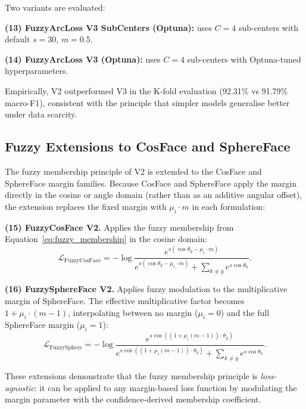 Two variants are evaluated:

\textbf{(13) FuzzyArcLoss V3 SubCenters (Optuna):} uses $C = 4$ sub-centers with default $s = 30$, $m = 0.5$.

\textbf{(14) FuzzyArcLoss V3 (Optuna):} uses $C = 4$ sub-centers with Optuna-tuned hyperparameters.

Empirically, V2 outperformed V3 in the K-fold evaluation (92.31\% vs 91.79\% macro-F1), consistent with the principle that simpler models generalise better under data scarcity.


\subsection{Fuzzy Extensions to CosFace and SphereFace}
\label{sec:bg:fuzzy_cosface_sphereface}

The fuzzy membership principle of V2 is extended to the CosFace and SphereFace margin families.
Because CosFace and SphereFace apply the margin directly in the cosine or angle domain (rather than as an additive angular offset), the extension replaces the fixed margin with $\mu_i \cdot m$ in each formulation:

\textbf{(15) FuzzyCosFace V2.}
Applies the fuzzy membership from Equation~\ref{eq:fuzzy_membership} in the cosine domain:
\begin{equation}
\label{eq:fuzzycosface}
\mathcal{L}_{\text{FuzzyCosFace}} = -\log \frac{e^{s(\cos\theta_y - \mu_i \cdot m)}}{e^{s(\cos\theta_y - \mu_i \cdot m)} + \sum_{k \neq y} e^{s \cos\theta_k}}.
\end{equation}

\textbf{(16) FuzzySphereFace V2.}
Applies fuzzy modulation to the multiplicative margin of SphereFace.
The effective multiplicative factor becomes $1 + \mu_i \cdot (m - 1)$, interpolating between no margin ($\mu_i = 0$) and the full SphereFace margin ($\mu_i = 1$):
\begin{equation}
\label{eq:fuzzyspherface}
\mathcal{L}_{\text{FuzzySphere}} = -\log \frac{e^{s \cos\left((1 + \mu_i (m-1)) \cdot \theta_y\right)}}{e^{s \cos\left((1 + \mu_i (m-1)) \cdot \theta_y\right)} + \sum_{k \neq y} e^{s \cos\theta_k}}.
\end{equation}

These extensions demonstrate that the fuzzy membership principle is \emph{loss-agnostic}: it can be applied to any margin-based loss function by modulating the margin parameter with the confidence-derived membership coefficient.


